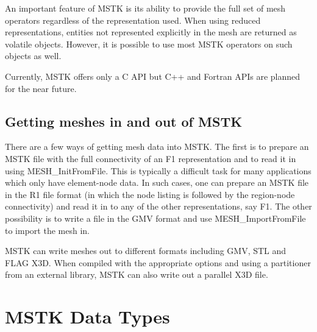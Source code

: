 \documentclass[12pt]{article}
\begin{document}
An important feature of MSTK is its ability to provide the full set of
mesh operators regardless of the representation used. When using
reduced representations, entities not represented explicitly in the
mesh are returned as volatile objects. However, it is possible to use
most MSTK operators on such objects as well.

Currently, MSTK offers only a C API but C++ and Fortran APIs are
planned for the near future.


\subsection{Getting meshes in and out of MSTK}

There are a few ways of getting mesh data into MSTK. The first is to
prepare an MSTK file with the full connectivity of an F1
representation and to read it in using MESH\_InitFromFile. This is
typically a difficult task for many applications which only have
element-node data. In such cases, one can prepare an MSTK file in the
R1 file format (in which the node listing is followed by the
region-node connectivity) and read it in to any of the other
representations, say F1. The other possibility is to write a file in
the GMV format and use MESH\_ImportFromFile to import the mesh in.

MSTK can write meshes out to different formats including GMV, STL and
FLAG X3D. When compiled with the appropriate options and using a
partitioner from an external library, MSTK can also write out a
parallel X3D file.

\newpage
\section{MSTK Data Types}
\end{document}
